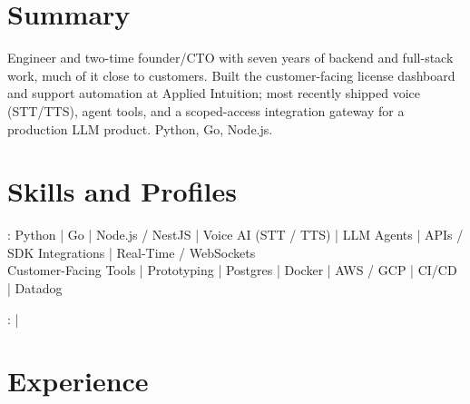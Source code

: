 \documentclass[print]{jack-resume}
\begin{document}
\pagecolor{darkmodeBackground}


\begin{minipage}[t][1cm][t]{.03\textwidth}
    \hfill
\end{minipage}

\section{Summary}
Engineer and two-time founder/CTO with seven years of backend and full-stack work, much of it close to customers. Built the customer-facing license dashboard and support automation at Applied Intuition; most recently shipped voice (STT/TTS), agent tools, and a scoped-access integration gateway for a production LLM product. Python, Go, Node.js.
\sectionsep

\section{Skills and Profiles}
:
Python \hfill | \hfill
Go \hfill | \hfill
Node.js / NestJS \hfill | \hfill
Voice AI (STT / TTS) \hfill | \hfill
LLM Agents \hfill | \hfill
APIs / SDK Integrations \hfill | \hfill
Real-Time / WebSockets \\
\hspace{1.0cm} Customer-Facing Tools \hfill | \hfill
Prototyping \hfill | \hfill
Postgres \hfill | \hfill
Docker \hfill | \hfill
AWS / GCP \hfill | \hfill
CI/CD \hfill | \hfill
Datadog \\

\raggedright{
    :
      \href{https://www.linkedin.com/in/jack-sturtevant/}{ \ExternalLink} |
     \href{https://github.com/jacksturt}{ \ExternalLink}}

\section{Experience}
\end{document}
